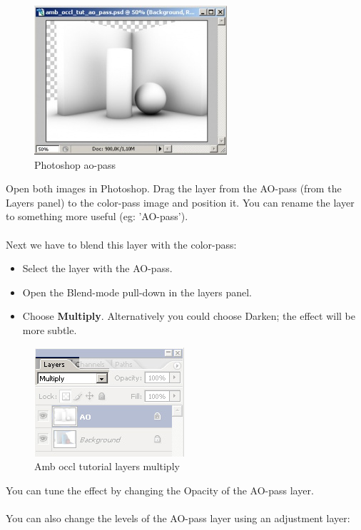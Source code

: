 \documentclass[10pt,a4paper]{article}
\begin{document}
\begin{figure}[tbh]
\centering
\includegraphics[width=0.5\linewidth]{figure/Photoshop_ao-pass}
\caption{Photoshop ao-pass}
\label{fig:photoshopao-pass}
\end{figure}

Open both images in Photoshop. Drag the layer from the AO-pass (from the Layers panel) to the color-pass image and position it. You can rename the layer to something more useful (eg: 'AO-pass').
\\
\\
Next we have to blend this layer with the color-pass:

\begin{itemize}
	\item Select the layer with the AO-pass.
	\item Open the Blend-mode pull-down in the layers panel.
	\item Choose \textbf{Multiply}. Alternatively you could choose Darken; the effect will be more subtle.
\end{itemize}

\begin{figure}[tbh]
\centering
\includegraphics[width=0.5\linewidth]{figure/Amb_occl_tutorial_layers_multiply}
\caption{Amb occl tutorial layers multiply}
\label{fig:amboccltutoriallayersmultiply}
\end{figure}

You can tune the effect by changing the Opacity of the AO-pass layer.
\\
\\
You can also change the levels of the AO-pass layer using an adjustment layer:
\end{document}
